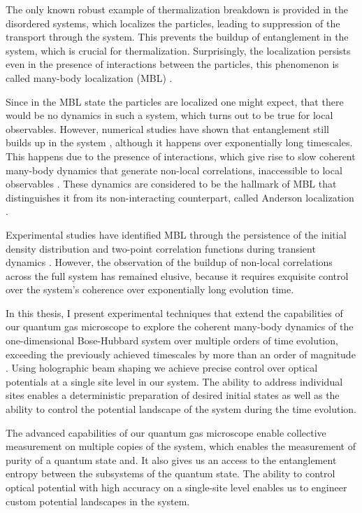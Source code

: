 The only known robust example of thermalization breakdown is provided in the disordered systems, which localizes the particles\cite{ Anderson1958}, leading to suppression of the transport through the system. This prevents the buildup of entanglement in the system, which is crucial for thermalization. Surprisingly, the localization persists even in the presence of interactions between the particles, this phenomenon is called many-body localization (MBL) \cite{ Anderson1958, Gornyi2005, Basko2006, Oganesyan2007}.

Since in the MBL state the particles are localized one might expect, that there would be no dynamics in such a system, which turns out to be true for local observables. However, numerical studies have shown that entanglement still builds up in the system \cite{Znidaric2008, Bardarson2012}, although it happens over exponentially long timescales. This happens due to the presence of interactions, which give rise to slow coherent many-body dynamics that generate non-local correlations, inaccessible to local observables \cite{Serbyn2013, Serbyn2013a, Huse2014}. These dynamics are considered to be the hallmark of MBL that distinguishes it from its non-interacting counterpart, called Anderson localization \cite{Anderson1958}.

Experimental studies have identified MBL through the persistence of the initial density distribution \cite{Schreiber2015, Smith2015, Bordia2016, Choi2016, Lueschen2017, Bordia2017} and two-point correlation functions during transient dynamics \cite{Smith2015}. However, the observation of the buildup of non-local correlations across the full system has remained elusive, because it requires exquisite control over the system's coherence over exponentially long evolution time.

In this thesis, I present experimental techniques that extend the capabilities of our quantum gas microscope \cite{Bakr2009} to explore the coherent many-body dynamics of the one-dimensional Bose-Hubbard system over multiple orders of time evolution, exceeding the previously achieved timescales by more than an order of magnitude \cite{Smith2015}. Using holographic beam shaping we achieve precise control over optical potentials at a single site level in our system. The ability to address individual sites enables a deterministic preparation of desired initial states as well as the ability to control the potential landscape of the system during the time evolution.

The advanced capabilities of our quantum gas microscope enable collective measurement on multiple copies of the system, which enables the measurement of purity of a quantum state and. It also gives us an access to the entanglement entropy between the subsystems of the quantum state. The ability to control optical potential with high accuracy on a single-site level enables us to engineer custom potential landscapes in the system.

